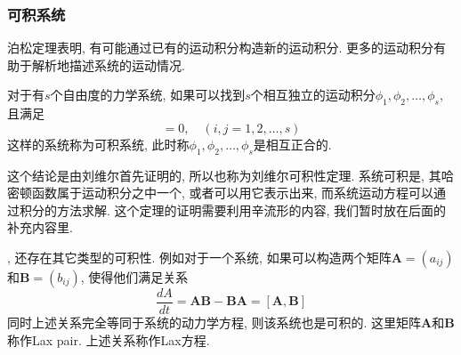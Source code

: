 \documentclass[a4paper,11pt]{article}
\theoremstyle{mystyle}
\begin{document}
\subsubsection{可积系统}
泊松定理表明, 有可能通过已有的运动积分构造新的运动积分. 更多的运动积分有助于解析地描述系统的运动情况.
\begin{definition}[可积系统]
  对于有$s$个自由度的力学系统, 如果可以找到$s$个相互独立的运动积分$\phi_1,\phi_2,\dots,\phi_s$, 且满足
\begin{equation*}
  [\phi_i,\phi_j]=0,\quad(i,j=1,2,\dots,s)
\end{equation*}
这样的系统称为可积系统, 此时称$\phi_1,\phi_2,\dots,\phi_s$是相互正合的.
\end{definition}
这个结论是由刘维尔首先证明的, 所以也称为刘维尔可积性定理. 系统可积是, 其哈密顿函数属于运动积分之中一个, 或者可以用它表示出来, 而系统运动方程可以通过积分的方法求解. 这个定理的证明需要利用辛流形的内容, 我们暂时放在后面的补充内容里.

, 还存在其它类型的可积性. 例如对于一个系统, 如果可以构造两个矩阵$\mathbf{A}=(a_{ij})$和$\mathbf{B}=(b_{ij})$, 使得他们满足关系
\begin{equation*}
  \frac{dA}{dt}=\mathbf{A}\mathbf{B}-\mathbf{B}\mathbf{A}=[\mathbf{A},\mathbf{B}]
\end{equation*}
同时上述关系完全等同于系统的动力学方程, 则该系统也是可积的. 这里矩阵$\mathbf{A}$和$\mathbf{B}$称作Lax pair. 上述关系称作Lax方程.
\end{document}
